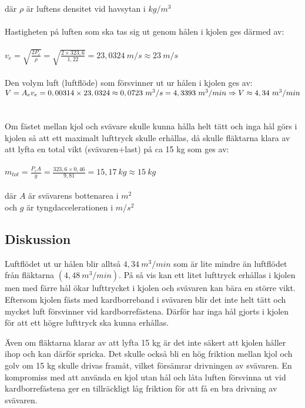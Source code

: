 där $\rho$ är luftens densitet vid havsytan i $ kg/m^3$ \\ \\
Hastigheten på luften som ska tas sig ut genom hålen i kjolen ges därmed av: \\
\\
\begin{math}
v_{e}=\sqrt{\frac{2P_{c}}{\rho}}=\sqrt{\frac{2\times323,6}{1,22}}=23,0324\ m/s
\approx 23\ m/s \end{math} \\ \\
Den volym luft (luftflöde) som försvinner ut ur hålen i kjolen ges av: \\
\begin{math}
V=A_{e}v_{e}=0,00314\times23,0324 \approx 0,0723\ m^3/s=4,3393\ m^3/min \\
\Rightarrow V \approx 4,34\ m^3/min
\end{math} \\ \\ \\
Om fästet mellan kjol och svävare skulle kunna hålla helt tätt och inga hål görs
i kjolen så att ett maximalt lufttryck skulle erhållas, då skulle fläktarna
klara av att lyfta en total vikt (svävaren+last) på ca 15 kg som ges av: \\ \\
\begin{math}
m_{tot}=\frac{P_{c}A}{g}=\frac{323,6\times0,46}{9,81}=15,17\ kg \approx 15\ kg
\end{math} \\ \\
där $A$ är svävarens bottenarea i $m^2$ \\
och $g$ är tyngdaccelerationen i $m/s^2$

\subsection{Diskussion}
Luftflödet ut ur hålen blir alltså $4,34\ m^3/min$ som är lite mindre än
luftflödet från fläktarna $(4,48\ m^3/min)$. På så vis kan ett litet lufttryck
erhållas i kjolen men med färre hål ökar lufttrycket i kjolen och svävaren kan
bära en större vikt. Eftersom kjolen fästs med kardborreband i svävaren blir det
inte helt tätt och mycket luft försvinner vid kardborrefästena. Därför har inga
hål gjorts i kjolen för att ett högre lufttryck ska kunna erhållas.

Även om fläktarna klarar av att lyfta 15 kg är det inte säkert att kjolen håller
ihop och kan därför spricka. Det skulle också bli en hög friktion mellan kjol
och golv om 15 kg skulle drivas framåt, vilket försämrar drivningen av svävaren.
En kompromiss med att använda en kjol utan hål och låta luften försvinna ut vid
kardborrefästena ger en tillräckligt låg friktion för att få en bra drivning av
svävaren. \\
